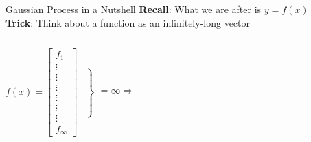 \documentclass[pdf]{beamer}
\begin{document}
\begin{frame}{Gaussian Process in a Nutshell}
\vspace{-0.2cm}
\textbf{Recall}: What we are after is $y = f(x)$\\
\vspace{0.3cm}
\textbf{Trick}: Think about a function as an infinitely-long vector 
\begin{columns}
	$f(x) =
	\left[
	\begin{array}{c}
	f_1 \\ \vdots \\ \vdots \\ \vdots \\ \vdots \\ \vdots \\ \vdots \\ f_\infty
	\end{array}
	\right]
	\left.
	\begin{array}{c}
	 \\  \\  \\  \\  \\  \\  \\ \\  \\ \\ \\ %
	\end{array}
	\right\}
	\begin{array}{c}
	 \\  \\  \\  \\ \\ =\infty \Longrightarrow \\  \\ \\  \\ \\ \\ %
	\end{array}
	$

\end{columns}
\end{frame}
\end{document}
